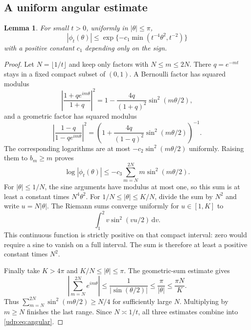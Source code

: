 \documentclass[11pt]{article}
\newtheorem{lemma}[theorem]{Lemma}
\theoremstyle{remark}\newtheorem{remark}[theorem]{Remark}
\newcommand{\dd}{\,\mathrm d}
\numberwithin{equation}{section}
\begin{document}
\subsection{A uniform angular estimate}
\begin{lemma}\label{udp:lem:angular}
For small $t>0$, uniformly in $|\theta|\le\pi$,
\begin{equation}\label{udp:eq:angular}
 |\phi_t(\theta)|\le
 \exp\{-c_1\min(t^{-4}\theta^2,t^{-2})\}
\end{equation}
with a positive constant $c_1$ depending only on the sign.
\end{lemma}
\begin{proof}
Let $N=\lfloor1/t\rfloor$ and keep only factors with $N\le m\le2N$. There $q=e^{-mt}$ stays in a fixed compact subset of $(0,1)$. A Bernoulli factor has squared modulus
\[
 \left|\frac{1+qe^{im\theta}}{1+q}\right|^2
 =1-\frac{4q}{(1+q)^2}\sin^2(m\theta/2),
\]
and a geometric factor has squared modulus
\[
 \left|\frac{1-q}{1-qe^{im\theta}}\right|^2
 =\left(1+\frac{4q}{(1-q)^2}\sin^2(m\theta/2)\right)^{-1}.
\]
The corresponding logarithms are at most $-c_2\sin^2(m\theta/2)$ uniformly. Raising them to $b_m\ge m$ proves
\[
 \log|\phi_t(\theta)|\le-c_3\sum_{m=N}^{2N}m\sin^2(m\theta/2).
\]
For $|\theta|\le1/N$, the sine arguments have modulus at most one, so this sum is at least a constant times $N^4\theta^2$. For $1/N\le|\theta|\le K/N$, divide the sum by $N^2$ and write $u=N|\theta|$. The Riemann sums converge uniformly for $u\in[1,K]$ to
\[
 \int_1^2 v\sin^2(vu/2)\dd v.
\]
This continuous function is strictly positive on that compact interval: zero would require a sine to vanish on a full interval. The sum is therefore at least a positive constant times $N^2$.

Finally take $K>4\pi$ and $K/N\le|\theta|\le\pi$. The geometric-sum estimate gives
\[
 \left|\sum_{m=N}^{2N}e^{im\theta}\right|
 \le\frac1{|\sin(\theta/2)|}\le\frac\pi{|\theta|}\le\frac{\pi N}K.
\]
Thus $\sum_{m=N}^{2N}\sin^2(m\theta/2)\ge N/4$ for sufficiently large $N$. Multiplying by $m\ge N$ finishes the last range. Since $N\asymp1/t$, all three estimates combine into \eqref{udp:eq:angular}.
\end{proof}
\end{document}
